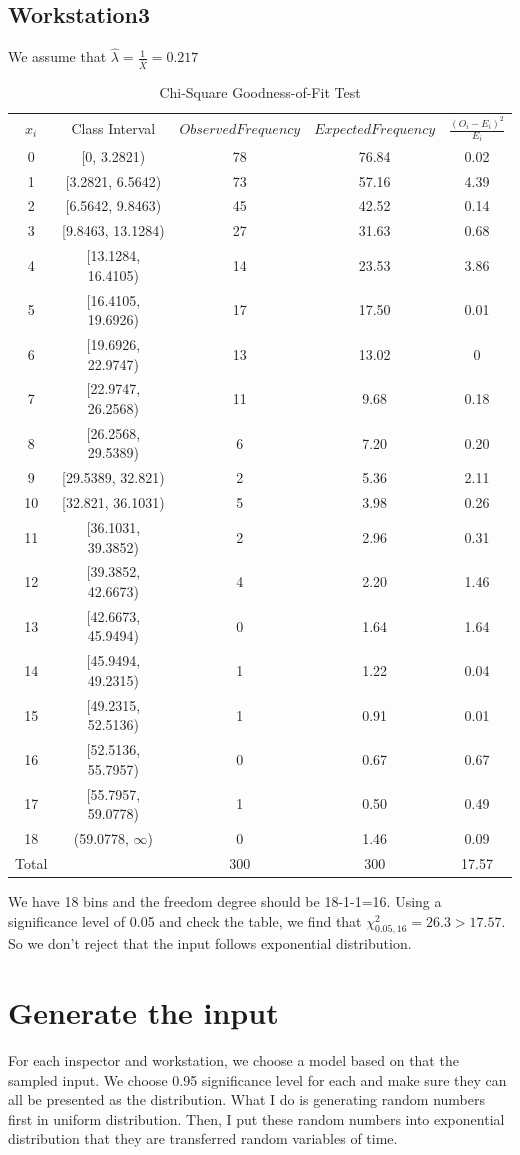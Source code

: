 \documentclass{article}
\begin{document}
\subsection{Workstation3}

We assume that $\hat{\lambda}=\frac{1}{\bar{X}}=0.217$
\begin{table}[htp]
\caption{Chi-Square Goodness-of-Fit Test}
\begin{center}
\begin{tabular}{ccccc}
\hline
$x_i$ & Class Interval & $Observed Frequency$ & $Expected Frequency$ & $\frac{(O_i-E_i)^2}{E_i}$\\
0&[0, 3.2821)&78&76.84&0.02\\
1&[3.2821, 6.5642)&73&57.16&4.39\\
2&[6.5642, 9.8463)&45&42.52&0.14\\
3&[9.8463, 13.1284)&27&31.63&0.68\\
4&[13.1284, 16.4105)&14&23.53&3.86\\
5&[16.4105, 19.6926)&17&17.50&0.01\\
6&[19.6926, 22.9747)&13&13.02&0\\
7&[22.9747, 26.2568)&11&9.68&0.18\\
8&[26.2568, 29.5389)&6&7.20&0.20\\
9&[29.5389, 32.821)&2&5.36&2.11\\
10&[32.821, 36.1031)&5&3.98&0.26\\
11&[36.1031, 39.3852)&2&2.96&0.31\\
12&[39.3852, 42.6673)&4&2.20&1.46\\
13&[42.6673, 45.9494)&0&1.64&1.64\\
14&[45.9494, 49.2315)&1&1.22&0.04\\
15&[49.2315, 52.5136)&1&0.91&0.01\\
16&[52.5136, 55.7957)&0&0.67&0.67\\
17&[55.7957, 59.0778)&1&0.50&0.49\\
18&(59.0778, $\infty$)&0&1.46&0.09\\
\hline
Total& &300&300&17.57\\

\hline

\end{tabular}
\end{center}
\label{default}
\end{table}%

We have 18 bins and the freedom degree should be 18-1-1=16. Using a significance level of 0.05 and check the table, we find that $\chi^2_{0.05, 16}=26.3 > 17.57$. So we don't reject that the input follows exponential distribution.

\section{Generate the input}

For each inspector and workstation, we choose a model based on that the sampled input. We choose 0.95 significance level for each and make sure they can all be presented as the distribution. What I do is generating random numbers first in uniform distribution. Then, I put these random numbers into exponential distribution that they are transferred random variables of time.
\end{document}
